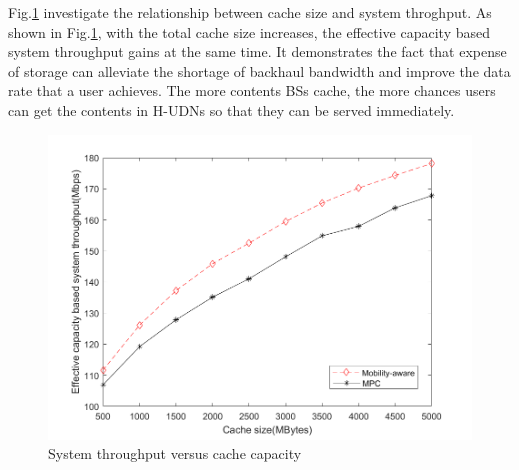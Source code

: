 \documentclass[conference]{IEEEtran}
\begin{document}
Fig.\ref{fig 4} investigate the relationship between cache size and system throghput. As shown in Fig.\ref{fig 4}, with the total cache size increases, the effective capacity based system throughput gains at the same time. It demonstrates the fact that expense of storage can alleviate the shortage of backhaul bandwidth and improve the data rate that a user achieves. The more contents BSs cache, the more chances users can get the contents in H-UDNs so that they can be served immediately.
\begin{figure}[htbp]
 \centerline{\includegraphics[scale=0.3]{fig4.png}}
 \caption{System throughput versus cache capacity}
 \label{fig 4}
\end{figure}
\end{document}

